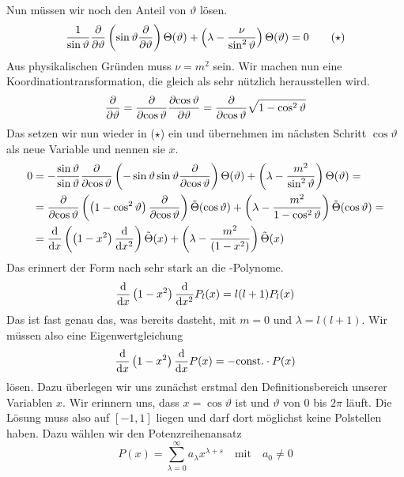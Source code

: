 \documentclass[a4paper,12pt,portrait]{book}
\numberwithin{equation}{section}
\begin{document}
Nun müssen wir noch den Anteil von $\vartheta$ lösen.
\begin{equation*}
\frac{1}{\sin\vartheta}\frac{\partial{}}{\partial{\vartheta}}\left(\sin\vartheta\frac{\partial{}}{\partial{\vartheta}}\right)\Theta(\vartheta) + \left(\lambda - \frac{\nu}{\sin^2\vartheta}\right)\Theta(\vartheta) = 0 \tag{$\star$}
\end{equation*}
Aus physikalischen Gründen muss $\nu=m^2$ sein. Wir machen nun eine Koordinationtransformation, die gleich als sehr nützlich herausstellen wird.
\begin{equation*}
\frac{\partial{}}{\partial{\vartheta}}=\frac{\partial{}}{\partial{\cos\vartheta}}\frac{\partial{\cos\vartheta}}{\partial{\vartheta}}=\frac{\partial{}}{\partial{\cos\vartheta}}\sqrt{1-\cos^2\vartheta}
\end{equation*}
Das setzen wir nun wieder in ($\star$) ein und übernehmen im nächsten Schritt $\cos\vartheta$ als neue Variable und nennen sie $x$.
\begin{align*}
0 & = -\frac{\sin\vartheta}{\sin\vartheta}\frac{\partial{}}{\partial{\cos\vartheta}}\left(-\sin\vartheta\sin\vartheta \frac{\partial{}}{\partial{\cos\vartheta}}\right)\Theta(\vartheta) + \left(\lambda-\frac{m^2}{\sin^2\vartheta}\right)\Theta(\vartheta) = \\
& = \frac{\partial{}}{\partial{\cos\vartheta}}\left( \left(1-\cos^2\vartheta\right)\frac{\partial{}}{\partial{\cos\vartheta}}\right)\tilde{\Theta}(\cos\vartheta) + \left(\lambda - \frac{m^2}{1-\cos^2\vartheta}\right)\tilde{\Theta}(\cos\vartheta) = \\
& = \frac{\mathrm{d}{}}{\mathrm{d}{x}}\left(\left(1-x^2\right)\frac{\mathrm{d}{}}{\mathrm{d}{x^2}}\right)\tilde{\Theta}(x) + 
\left(\lambda - \frac{m^2}{(1-x^2)}\right)\tilde{\Theta}(x)
\end{align*}
Das erinnert der Form nach sehr stark an die -Polynome.
\begin{equation*}
\frac{\mathrm{d}{}}{\mathrm{d}{x}}\left(1-x^2\right)\frac{\mathrm{d}{}}{\mathrm{d}{x^2}}P_l(x) = l(l+1)P_l(x)
\end{equation*}
Das ist fast genau das, was bereits dasteht, mit $m=0$ und $\lambda=l(l+1)$.
Wir müssen also eine Eigenwertgleichung 
\begin{equation*}
\frac{\mathrm{d}{}}{\mathrm{d}{x}}\left(1-x^2\right)\frac{\mathrm{d}{}}{\mathrm{d}{x}}P(x) = -\text{const.}\cdot P(x)
\end{equation*}
lösen. Dazu überlegen wir uns zunächst erstmal den Definitionsbereich unserer Variablen $x$. Wir erinnern uns, dass $x=\cos\vartheta$ ist und $\vartheta$ von $0$ bis $2\pi$ läuft. Die Lösung muss also auf $[-1,1]$ liegen und darf dort möglichst keine Polstellen haben. Dazu wählen wir den Potenzreihenansatz
\begin{equation*}
P(x) = \sum\limits_{\lambda=0}^\infty a_\lambda x^{\lambda+s} \quad\text{mit}\quad a_0\neq 0
\end{equation*}
\end{document}
